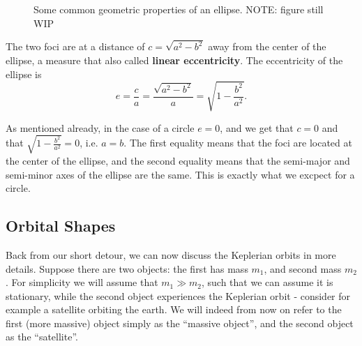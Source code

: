 \begin{figure}
	\begin{center}
	\end{center}
	\caption{Some common geometric properties of an ellipse. NOTE: figure still WIP}
	\label{fig:ellipse_geometerically}
\end{figure}

The two foci are at a distance of $c=\sqrt{a^{2}-b^{2}}$ away from the center of the ellipse, a measure that also called \textbf{linear eccentricity}. The eccentricity of the ellipse is
\begin{equation}
	e = \frac{c}{a} = \frac{\sqrt{a^{2}-b^{2}}}{a} = \sqrt{1-\frac{b^{2}}{a^{2}}}.
	\label{eq:label}
\end{equation}

As mentioned already, in the case of a circle $e=0$, and we get that $c=0$ and that $\sqrt{1-\frac{b^{2}}{a^{2}}}=0$, i.e. $a=b$. The first equality means that the foci are located at the center of the ellipse, and the second equality means that the semi-major and semi-minor axes of the ellipse are the same. This is exactly what we excpect for a circle.


\subsection{Orbital Shapes}
Back from our short detour, we can now discuss the Keplerian orbits in more details. Suppose there are two objects: the first has mass $m_{1}$, and second mass $m_{2}$. For simplicity we will assume that $m_{1}\gg m_{2}$, such that we can assume it is stationary, while the second object experiences the Keplerian orbit - consider for example a satellite orbiting the earth. We will indeed from now on refer to the first (more massive) object simply as the \enquote{massive object}, and the second object as the \enquote{satellite}.

